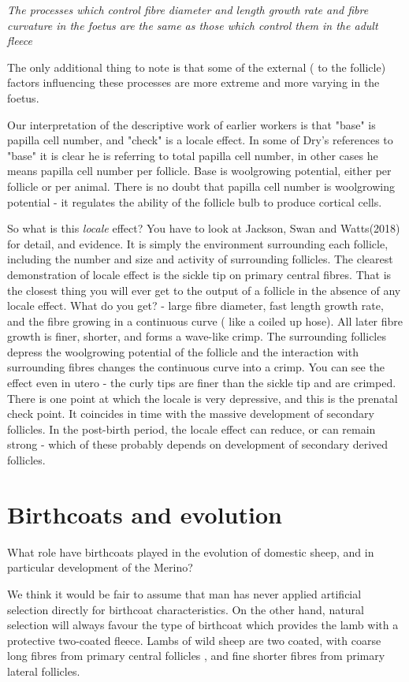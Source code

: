 \documentclass[titlepage]{article}  %
\begin{document}
{\em The processes which control fibre diameter and length growth rate and fibre curvature in the foetus are the same as those which control them in the adult fleece}

The only additional thing to note is that some of the external ( to the follicle) factors influencing these processes are more extreme and more varying in the foetus.

Our interpretation of the descriptive work of earlier workers is that "base" is papilla cell number, and "check" is a locale effect. In some of Dry's references to "base" it is clear he is referring to total papilla cell number, in other cases he means papilla cell number per follicle.  Base is woolgrowing potential, either per follicle or per animal. There is no doubt that papilla cell number is woolgrowing potential - it regulates the ability of the follicle bulb to produce cortical cells.

So what is this {\em locale} effect? You have to look at Jackson, Swan and Watts(2018) for detail, and evidence.  It is simply the environment surrounding each follicle, including the number and size and activity of surrounding follicles. The clearest demonstration of locale effect is the sickle tip on primary central fibres. That is the closest thing you will ever get to the output of a follicle in the absence of any locale effect. What do you get? - large fibre diameter, fast length growth rate, and the fibre growing in a continuous curve ( like a coiled up hose). All later fibre growth is finer, shorter, and forms a wave-like crimp. The surrounding follicles depress the woolgrowing potential of the follicle and the interaction with surrounding fibres changes the continuous curve into a crimp. You can see the effect even in utero - the curly tips are finer than the sickle tip and are crimped. There is one point at which the locale is very depressive, and this is the prenatal check point. It coincides in time with the massive development of secondary follicles. In the post-birth period, the locale effect can reduce, or can remain strong - which of these probably depends on development of secondary derived follicles.

\section{Birthcoats and evolution}
What role have birthcoats played in the evolution of domestic sheep, and in particular development of the Merino?

We think it would be fair to assume that man has never applied artificial selection directly for birthcoat characteristics. On the other hand, natural selection will always favour the type of birthcoat which provides the lamb with a protective two-coated fleece.  Lambs of wild sheep are two coated, with coarse long fibres from primary central follicles , and fine shorter fibres from primary lateral follicles.
\end{document}
